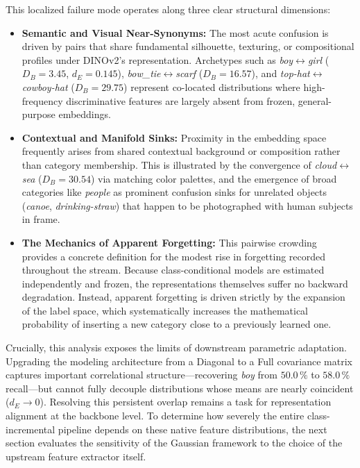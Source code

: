 This localized failure mode operates along three clear structural dimensions:
\begin{itemize}
	\item \textbf{Semantic and Visual Near-Synonyms:} The most acute confusion is driven by pairs that share fundamental silhouette, texturing, or compositional profiles under DINOv2's representation. Archetypes such as \textit{boy}$\leftrightarrow$\textit{girl} ($D_B = 3.45$, $d_E = 0.145$), \textit{bow\_tie}$\leftrightarrow$\textit{scarf} ($D_B = 16.57$), and \textit{top-hat}$\leftrightarrow$\textit{cowboy-hat} ($D_B = 29.75$) represent co-located distributions where high-frequency discriminative features are largely absent from frozen, general-purpose embeddings.
	\item \textbf{Contextual and Manifold Sinks:} Proximity in the embedding space frequently arises from shared contextual background or composition rather than category membership. This is illustrated by the convergence of \textit{cloud}$\leftrightarrow$\textit{sea} ($D_B = 30.54$) via matching color palettes, and the emergence of broad categories like \textit{people} as prominent confusion sinks for unrelated objects (\textit{canoe}, \textit{drinking-straw}) that happen to be photographed with human subjects in frame.
	\item \textbf{The Mechanics of Apparent Forgetting:} This pairwise crowding provides a concrete definition for the modest rise in forgetting recorded throughout the stream. Because class-conditional models are estimated independently and frozen, the representations themselves suffer no backward degradation. Instead, apparent forgetting is driven strictly by the expansion of the label space, which systematically increases the mathematical probability of inserting a new category close to a previously learned one.
\end{itemize}

Crucially, this analysis exposes the limits of downstream parametric adaptation. Upgrading the modeling architecture from a Diagonal to a Full covariance matrix captures important correlational structure—recovering \textit{boy} from $50.0\,\%$ to $58.0\,\%$ recall—but cannot fully decouple distributions whose means are nearly coincident ($d_E \to 0$). Resolving this persistent overlap remains a task for representation alignment at the backbone level. To determine how severely the entire class-incremental pipeline depends on these native feature distributions, the next section evaluates the sensitivity of the Gaussian framework to the choice of the upstream feature extractor itself.

